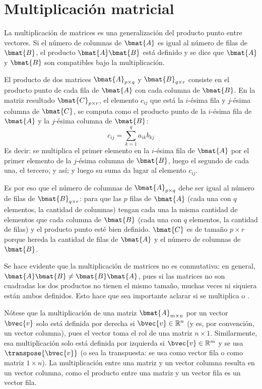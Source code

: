 \section{Multiplicación matricial} \label{apx:multiplicacion_matricial}

La multiplicación de matrices es una generalización del producto punto entre vectores. Si el número de columnas de \( \bmat{A} \) es igual al número de filas de \( \bmat{B} \), el producto \( \bmat{A}\bmat{B} \) está definido y se dice que \( \bmat{A} \) y  \( \bmat{B} \) son compatibles bajo la multiplicación. 

El producto de dos matrices \( \bmat{A}_{p \times q} \) y \( \bmat{B}_{q \times r} \) consiste en el producto punto de cada fila de \( \bmat{A} \) con cada columna de \( \bmat{B} \). En la matriz resultado \(\bmat{C}_{p \times r}\), el elemento \(c_{ij}\) que está la \(i\)-ésima fila y \(j\)-ésima columna de \(\bmat{C}\), se computa como el producto punto de la \(i\)-ésima fila de \(\bmat{A}\) y la \(j\)-ésima columna de \(\bmat{B}\):
\[c_{ij} = \sum_{k = 1}^{q} a_{ik} b_{kj}\]
Es decir: se multiplica el primer elemento en la \(i\)-ésima fila de \(\bmat{A}\) por el primer elemento de la \(j\)-ésima columna de \(\bmat{B}\), luego el segundo de cada una, el tercero, y así; y luego su suma da lugar al elemento \(c_{ij}\). 

Es por eso que el número de columnas de \(\bmat{A}_{p\times q}\) debe ser igual al número de filas de \(\bmat{B}_{q \times r}\): para que las \(p\) filas de \(\bmat{A}\) (cada una con \(q\) elementos, la cantidad de columnas) tengan cada una la misma cantidad de elementos que cada columna de \(\bmat{B}\) (cada una con \(q\) elementos, la cantidad de filas) y el producto punto esté bien definido. \(\bmat{C}\) es de tamaño \(p\times r\) porque hereda la cantidad de filas de \(\bmat{A}\) y el número de columnas de \(\bmat{B}\).

Se hace evidente que la multiplicación de matrices no es conmutativa: en general, \(\bmat{A} \bmat{B} \neq \bmat{B} \bmat{A}\), pues si las matrices no son cuadradas los dos productos no tienen el mismo tamaño, muchas veces ni siquiera están ambos definidos. Esto hace que sea importante aclarar si se multiplica  o .

Nótese que la multiplicación de una matriz \( \bmat{A}_{m \times n} \) por un vector \( \bvec{v} \) solo está definida por derecha si \(\bvec{v} \in \mathbb{R}^{n}\) (y es, por convención, un vector columna), pues el vector toma el rol de una matriz \(n\times 1\). Similarmente, esa multiplicación solo está definida por izquierda si \(\bvec{v} \in \mathbb{R}^{m}\) y se usa \(\transpose{\bvec{v}}\) (o sea la transpuesta: se usa como vector fila o como matriz  \(1\times n\)). La multiplicación entre una matriz y un vector columna resulta en un vector columna, como el producto entre una matriz y un vector fila es un vector fila.

